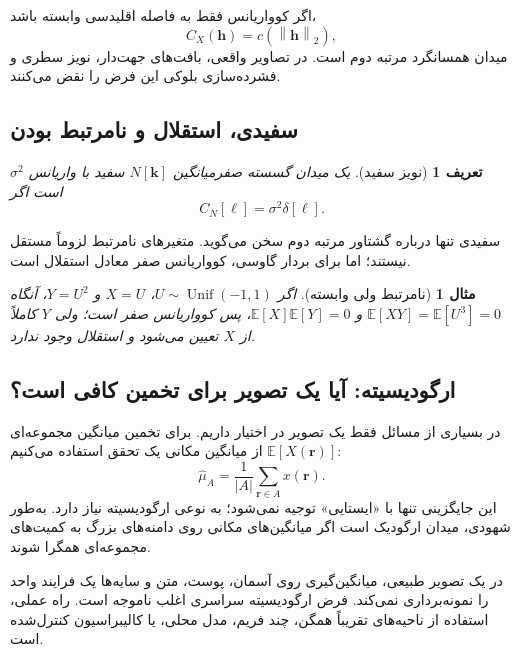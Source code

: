 \documentclass[12pt,openany,oneside]{book}
\newtheorem{definition}{تعریف}[chapter]
\newtheorem{example}{مثال}[chapter]
\newcommand{\E}{\mathbb{E}}
\newcommand{\norm}[1]{\left\lVert #1\right\rVert}
\newcommand{\vect}[1]{\bm{#1}}
\begin{document}
اگر کوواریانس فقط به فاصله اقلیدسی وابسته باشد،
\begin{equation}
C_X(\vect{h})=c(\norm{\vect{h}}_2),
\end{equation}
میدان همسانگرد مرتبه دوم است. در تصاویر واقعی، بافت‌های جهت‌دار، نویز سطری و فشرده‌سازی بلوکی
این فرض را نقض می‌کنند.

\subsection{سفیدی، استقلال و نامرتبط بودن}

\begin{definition}[نویز سفید]
یک میدان گسسته صفرمیانگین \(N[\vect{k}]\) سفید با واریانس \(\sigma^2\) است اگر
\begin{equation}
C_N[\vect \ell]=\sigma^2\delta[\vect \ell].
\end{equation}
\end{definition}

سفیدی تنها درباره گشتاور مرتبه دوم سخن می‌گوید. متغیرهای نامرتبط لزوماً مستقل نیستند؛ اما برای بردار
گاوسی، کوواریانس صفر معادل استقلال است.

\begin{example}[نامرتبط ولی وابسته]
اگر \(U\sim\operatorname{Unif}(-1,1)\)، \(X=U\) و \(Y=U^2\)، آنگاه
\(\E[XY]=\E[U^3]=0\) و \(\E[X]\E[Y]=0\)، پس کوواریانس صفر است؛ ولی \(Y\) کاملاً از \(X\)
تعیین می‌شود و استقلال وجود ندارد.
\end{example}

\subsection{ارگودیسیته: آیا یک تصویر برای تخمین کافی است؟}

در بسیاری از مسائل فقط یک تصویر در اختیار داریم. برای تخمین میانگین مجموعه‌ای
\(\E[X(\vect{r})]\) از میانگین مکانی یک تحقق استفاده می‌کنیم:
\begin{equation}
\widehat\mu_A=\frac{1}{|A|}\sum_{\vect{r}\in A}x(\vect{r}).
\end{equation}
این جایگزینی تنها با «ایستایی» توجیه نمی‌شود؛ به نوعی ارگودیسیته نیاز دارد. به‌طور شهودی، میدان
ارگودیک است اگر میانگین‌های مکانی روی دامنه‌های بزرگ به کمیت‌های مجموعه‌ای همگرا شوند.

\begin{warningbox}
در یک تصویر طبیعی، میانگین‌گیری روی آسمان، پوست، متن و سایه‌ها یک فرایند واحد را نمونه‌برداری نمی‌کند.
فرض ارگودیسیته سراسری اغلب ناموجه است. راه عملی، استفاده از ناحیه‌های تقریباً همگن، چند فریم، مدل محلی،
یا کالیبراسیون کنترل‌شده است.
\end{warningbox}
\end{document}
